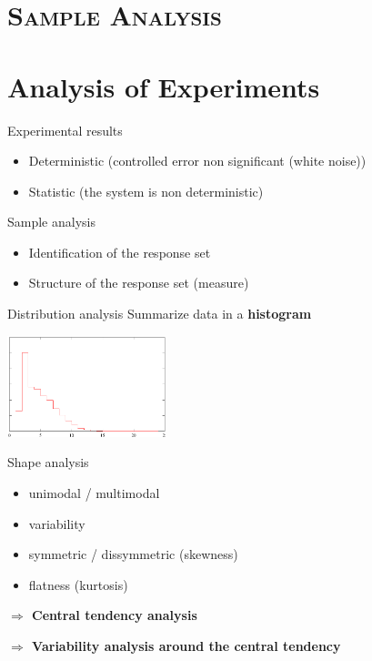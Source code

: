 \documentclass[xcolor=x11names,compress,8pt,
handout
]{beamer}
\renewcommand{\(}{\begin{columns}}
\renewcommand{\)}{\end{columns}}
\newcommand{\<}[1]{\begin{column}{#1}}
\renewcommand{\>}{\end{column}}
\begin{document}
\section[{\scshape Sample Analysis}]{{\scshape Sample Analysis}}

\section{Analysis of Experiments}
\begin{frame}{Experimental results}
\begin{itemize}
\item Deterministic (controlled error non significant (white noise))
\item Statistic (the system is non deterministic)
\end{itemize}
\begin{block}{Sample analysis}
\begin{itemize}
\item Identification of the response set
\item Structure of the response set (measure)
\end{itemize}

\end{block}
\end{frame}

\begin{frame}{Distribution  analysis}
Summarize data in a {\bf histogram}
\begin{center}
\includegraphics[width=4.6cm]{histogramme.pdf}
\end{center}
\begin{block}{Shape analysis}
\begin{itemize}
\item unimodal / multimodal
\item variability
\item symmetric / dissymmetric (skewness)
\item flatness (kurtosis)
\end{itemize}
\alert{\bf $\Longrightarrow$ Central tendency analysis} 

\alert{\bf $\Longrightarrow$ Variability analysis around the central tendency} 

\end{block}
\end{frame}
\end{document}
